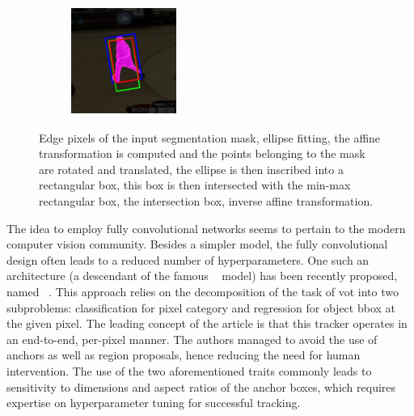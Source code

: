 \begin{figure}[t]
\begin{subfigure}[b]{0.135\textwidth}
        \caption[]{}
    \end{subfigure}
    \hfill
    \begin{subfigure}[b]{0.135\textwidth}
        \centering
        \includegraphics[width=\textwidth]{figures/theoretical_foundations/fast_vot_rot_bbox_algo_07.pdf}
        \caption[]{}
    \end{subfigure}
    \caption[Rotated \gls{bbox} by ellipse fitting]{ Edge pixels of the input segmentation mask,  ellipse fitting,  the affine transformation is computed and the points belonging to the mask are rotated and translated,  the ellipse is then inscribed into a rectangular box,  this box is then intersected with the min-max rectangular box,  the intersection box,  inverse affine transformation. }
    \label{fig:FastVOTRotBBOXFitting}
\end{figure}

The idea to employ fully convolutional networks seems to pertain to the modern computer vision community. Besides a simpler model, the fully convolutional design often leads to a reduced number of hyperparameters. One such an architecture (a descendant of the famous ~\cite{bertinetto2016siamfc} model) has been recently proposed, named ~\cite{guo2019siamcar}. This approach relies on the decomposition of the task of \gls{vot} into two subproblems: classification for pixel category and regression for object \gls{bbox} at the given pixel. The leading concept of the article is that this tracker operates in an end-to-end, per-pixel manner. The authors managed to avoid the use of anchors as well as region proposals, hence reducing the need for human intervention. The use of the two aforementioned traits commonly leads to sensitivity to dimensions and aspect ratios of the anchor boxes, which requires expertise on hyperparameter tuning for successful tracking.

